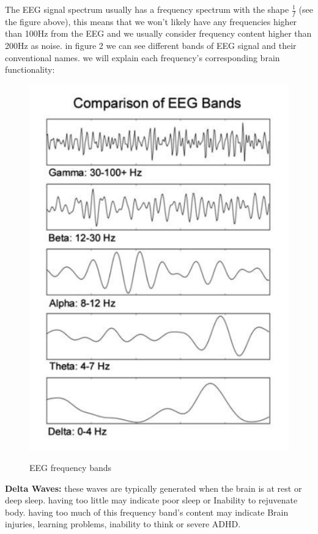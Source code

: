\documentclass[11pt]{article}
\begin{document}
The EEG signal spectrum usually has a frequency spectrum with the shape $\frac{1}{f}$ 
(see the figure above), this means that we won't likely have 
any frequencies higher than 100Hz from the EEG and we usually consider frequency
content higher than 200Hz as noise. in figure 2 we can see different bands of
EEG signal and their conventional names. we will explain each frequency's corresponding brain functionality: \\

\begin{figure}[H]
    \begin{center}
        \includegraphics[scale=0.45]{Fig/EEGfreqs.png}
        \label{fig:EEGfreqBands}
        \caption{EEG frequency bands}
    \end{center}
\end{figure}

\textbf{Delta Waves: } these waves are typically generated when the brain is 
at rest or deep sleep. having too little may indicate poor sleep or Inability to rejuvenate body.
having too much of this frequency band's content may indicate Brain injuries, learning problems, inability to think or severe ADHD. \\
\end{document}
